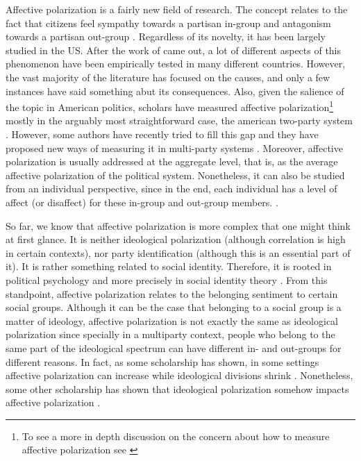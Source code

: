 \documentclass[a4paper, svgnames]{article}
\begin{document}
Affective polarization is a fairly new field of research. The concept relates to the fact that citizens feel sympathy towards a partisan in-group and antagonism towards a partisan out-group \citep{Wagner2021}. Regardless of its novelty, it has been largely studied in the US. After the work of \cite{Iyengar2012} came out, a lot of different aspects of this phenomenon have been empirically tested in many different countries. However, the vast majority of the literature has focused on the causes, and only a few instances have said something abut its consequences. Also, given the salience of the topic in American politics, scholars have measured affective polarization\footnote{To see a more in depth discussion on the concern about how to measure affective polarization see \cite{Druckman2019}} mostly in the arguably most straightforward case, the american two-party system \citep{Wagner2021}. However, some authors have recently tried to fill this gap and they have proposed new ways of measuring it in multi-party systems \citep{Reiljan2020}. Moreover, affective polarization is usually addressed at the aggregate level, that is, as the average affective polarization of the political system. Nonetheless, it can also be studied from an individual perspective, since in the end, each individual has a level of affect (or disaffect) for these in-group and out-group members. \citep{Wagner2021}.

So far, we know that affective polarization is more complex that one might think at first glance. It is neither ideological polarization (although correlation is high in certain contexts), nor party identification (although this is an essential part of it). It is rather something related to social identity. Therefore, it is rooted in political psychology and more precisely in social identity theory \citep{Tajfel1979}. From this standpoint, affective polarization relates to the belonging sentiment to certain social groups. Although it can be the case that belonging to a social group is a matter of ideology, affective polarization is not exactly the same as ideological polarization since specially in a multiparty context, people who belong to the same part of the ideological spectrum can have different in- and out-groups for different reasons. In fact, as some scholarship has shown, in some settings affective polarization can increase while ideological divisions shrink \citep{Levendusky2016, Iyengar2019}. Nonetheless, some other scholarship has shown that ideological polarization somehow impacts affective polarization \citep{Rogowski2016a, Webster2017}.
\end{document}
